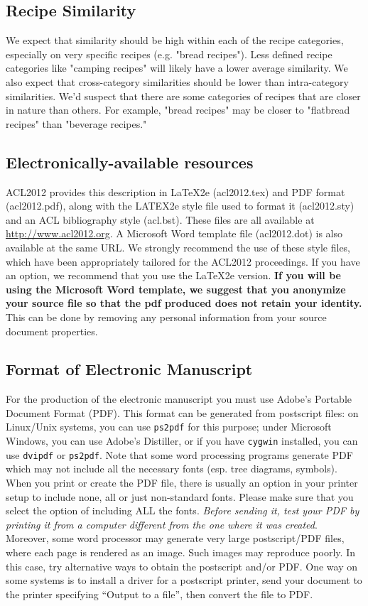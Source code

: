 \documentclass[11pt]{article}
\begin{document}
\subsection{Recipe Similarity}

We expect that similarity should be high within each of the recipe categories, especially on very specific recipes (e.g. "bread recipes"). Less defined recipe categories like "camping recipes" will likely have a lower average similarity. We also expect that cross-category similarities should be lower than intra-category similarities. We'd suspect that there are some categories of recipes that are closer in nature than others. For example, "bread recipes" may be closer to "flatbread recipes" than "beverage recipes."

\subsection{Electronically-available resources}

ACL2012 provides this description in \LaTeX2e (acl2012.tex) and PDF format (acl2012.pdf), along with the LATEX2e style file used to format it (acl2012.sty) and an ACL bibliography style (acl.bst). These files are all available at \url{http://www.acl2012.org}.  A Microsoft Word template file (acl2012.dot) is also available at the same URL. We strongly recommend the use of these style files, which have been appropriately tailored for the ACL2012 proceedings. If you have an option, we recommend that you use the \LaTeX2e version. \textbf{If you will be using the Microsoft Word template, we suggest that you anonymize your source file so that the pdf produced does not retain your identity.} This can be done by removing any personal information from your source
document properties.


\subsection{Format of Electronic Manuscript}
\label{sect:pdf}

For the production of the electronic manuscript you must use Adobe's
Portable Document Format (PDF). This format can be generated from
postscript files: on Linux/Unix systems, you can use {\tt ps2pdf} for this
purpose; under Microsoft Windows, you can use Adobe's Distiller, or
if you have {\tt cygwin} installed, you can use {\tt dvipdf} or
{\tt ps2pdf}.  Note
that some word processing programs generate PDF which may not include
all the necessary fonts (esp. tree diagrams, symbols). When you print
or create the PDF file, there is usually an option in your printer
setup to include none, all or just non-standard fonts.  Please make
sure that you select the option of including ALL the fonts.  {\em Before sending it, test your PDF by printing it from a computer different from the one where it was created}. Moreover,
some word processor may generate very large postscript/PDF files,
where each page is rendered as an image. Such images may reproduce
poorly.  In this case, try alternative ways to obtain the postscript
and/or PDF.  One way on some systems is to install a driver for a
postscript printer, send your document to the printer specifying
``Output to a file'', then convert the file to PDF.
\end{document}
